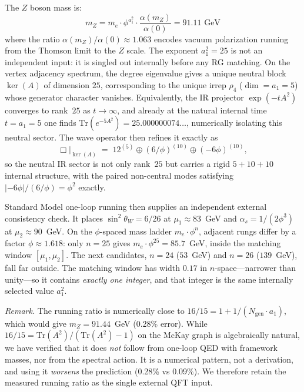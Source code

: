 \documentclass[12pt,a4paper]{article}
\theoremstyle{definition}
\begin{document}
The $Z$ boson mass is:
\begin{equation}
\boxed{m_Z = m_e \cdot \phi^{a_1^2} \cdot \frac{\alpha(m_Z)}{\alpha(0)} = 91.11 \text{ GeV}}
\label{eq:mz}
\end{equation}
where the ratio $\alpha(m_Z)/\alpha(0) \approx 1.063$ encodes vacuum polarization running from the Thomson limit to the $Z$ scale.  The exponent $a_1^2 = 25$ is not an independent input: it is singled out internally before any RG matching.  On the vertex adjacency spectrum, the degree eigenvalue gives a unique neutral block $\ker(A)$ of dimension $25$, corresponding to the unique irrep $\rho_4$ ($\dim = a_1 = 5$) whose generator character vanishes.  Equivalently, the IR projector $\exp(-tA^2)$ converges to rank~$25$ as $t \to \infty$, and already at the natural internal time $t = a_1 = 5$ one finds $\mathrm{Tr}(e^{-5A^2}) = 25.000000074\ldots$, numerically isolating this neutral sector.  The wave operator then refines it exactly as
\[
\Box|_{\ker(A)} \;=\; 12^{(5)} \oplus (6/\phi)^{(10)} \oplus (-6\phi)^{(10)},
\]
so the neutral IR sector is not only rank~$25$ but carries a rigid $5 + 10 + 10$ internal structure, with the paired non-central modes satisfying $|{-6\phi}|/(6/\phi) = \phi^2$ exactly.

Standard Model one-loop running then supplies an independent external consistency check.  It places $\sin^2\theta_W = 6/26$ at $\mu_1 \approx 83$~GeV and $\alpha_s = 1/(2\phi^3)$ at $\mu_2 \approx 90$~GeV.  On the $\phi$-spaced mass ladder $m_e \cdot \phi^n$, adjacent rungs differ by a factor $\phi \approx 1.618$: only $n = 25$ gives $m_e \cdot \phi^{25} = 85.7$~GeV, inside the matching window $[\mu_1, \mu_2]$.  The next candidates, $n = 24$ ($53$~GeV) and $n = 26$ ($139$~GeV), fall far outside.  The matching window has width $0.17$ in $n$-space---narrower than unity---so it contains \emph{exactly one integer}, and that integer is the same internally selected value $a_1^2$.

\noindent\textit{Remark.}  The running ratio is numerically close to $16/15 = 1 + 1/(N_{\text{gen}} \cdot a_1)$, which would give $m_Z = 91.44$~GeV (0.28\% error).  While $16/15 = \mathrm{Tr}(A^2)/(\mathrm{Tr}(A^2)-1)$ on the McKay graph is algebraically natural, we have verified that it does \emph{not} follow from one-loop QED with framework masses, nor from the spectral action.  It is a numerical pattern, not a derivation, and using it \emph{worsens} the prediction (0.28\% vs 0.09\%).  We therefore retain the measured running ratio as the single external QFT input.
\end{document}
